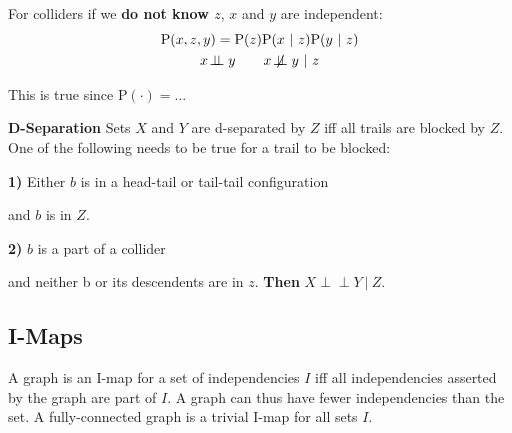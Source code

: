 \documentclass{article}
\newcommand{\prob}{\text{P}}
\newcommand{\pr}{\prob}
\newcommand{\giv}{\ |\ }
\newcommand\indep{\!\perp\!\!\!\perp}
\newcommand\notindep{\not\!\perp\!\!\!\perp}
\begin{document}
For colliders if we \textbf{do not know $z$}, $x$ and $y$ are independent:
\begin{gather*}
    \pr(x, z, y) = \pr(z) \pr(x \giv z) \pr(y \giv z) \\
    x \indep y \quad\quad x \notindep y \giv z
\end{gather*}

This is true since $\pr(\cdot) = $...

\textbf{D-Separation}
Sets $X$ and $Y$ are d-separated by $Z$ iff all trails are blocked by $Z$. One of the following needs to be true for a trail to be blocked:

\textbf{1)} Either $b$ is in a head-tail or tail-tail configuration

\qquad
     \qquad

and $b$ is in $Z$.

\textbf{2)} $b$ is a part of a collider

\qquad {}

and neither b or its descendents are in $z$. \textbf{Then} $X \indep Y \giv Z$.

\subsection{I-Maps}
A graph is an I-map for a set of independencies $I$ iff all independencies asserted by the graph are part of $I$. A graph can thus have fewer independencies than the set. A fully-connected graph is a trivial I-map for all sets $I$.
\end{document}
